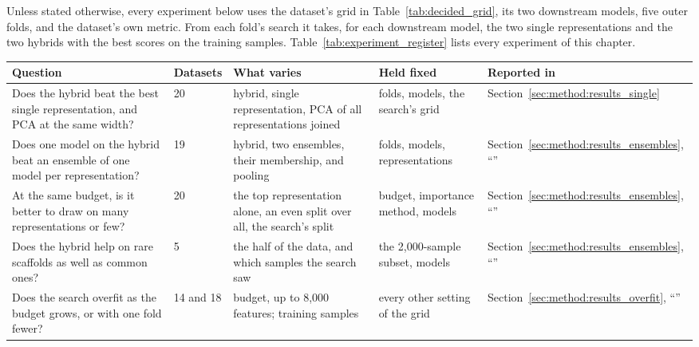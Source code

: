 Unless stated otherwise, every experiment below uses the dataset's grid in Table~\ref{tab:decided_grid}, its two downstream models, five outer folds, and the dataset's own metric. From each fold's search it takes, for each downstream model, the two single representations and the two hybrids with the best scores on the training samples. Table~\ref{tab:experiment_register} lists every experiment of this chapter.

\begin{table}[htbp]
\centering
\footnotesize
\setlength{\tabcolsep}{5pt} %
\begin{adjustbox}{max width=\textwidth,max totalheight=0.85\textheight}
\begin{tabular}{@{}P{3.2cm}P{2.2cm}P{3.2cm}P{3.0cm}P{2.1cm}@{}}
\toprule
Question & Datasets & What varies & Held fixed & Reported in \\
\midrule
Does the hybrid beat the best single representation, and PCA at the same width? & 20 & hybrid, single representation, PCA of all representations joined & folds, models, the search's grid & Section~\ref{sec:method:results_single} \\
Does one model on the hybrid beat an ensemble of one model per representation? & 19 & hybrid, two ensembles, their membership, and pooling & folds, models, representations & Section~\ref{sec:method:results_ensembles}, ``'' \\
At the same budget, is it better to draw on many representations or few? & 20 & the top representation alone, an even split over all, the search's split & budget, importance method, models & Section~\ref{sec:method:results_ensembles}, ``'' \\
Does the hybrid help on rare scaffolds as well as common ones? & 5 & the half of the data, and which samples the search saw & the 2{,}000-sample subset, models & Section~\ref{sec:method:results_ensembles}, ``'' \\
Does the search overfit as the budget grows, or with one fold fewer? & 14 and 18 & budget, up to 8{,}000 features; training samples & every other setting of the grid & Section~\ref{sec:method:results_overfit}, ``'' \\

\end{tabular}
\end{adjustbox}
\end{table}
